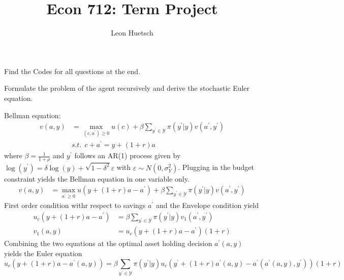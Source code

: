 \documentclass[letterpaper,12pt]{article}
\title{\fontsize{16pt}{1em}\bfseries Econ 712: Term Project}
\author{Leon Huetsch}
\newenvironment{problem}[2][Problem]{\begin{trivlist}
\item[\hskip \labelsep {\bfseries #1}\hskip \labelsep {\bfseries #2.}]}{\end{trivlist}}
\newenvironment{solution}[2][Solution]{\begin{trivlist}
\item[\hskip \labelsep {\bfseries #1}\hskip \labelsep {\bfseries #2.}]}{\end{trivlist}}
\begin{document}
\maketitle
Find the Codes for all questions at the end.

\begin{problem}{1}
Formulate the problem of the agent recursively and derive the stochastic Euler equation.
\end{problem}
\begin{solution}{1}
\begin{framed} 
Bellman equation:
\begin{align*}
v(a,y) &= \max_{(c,a^{\prime})\ge 0} u(c) + \beta \sum_{y^{\prime} \in \mathcal{Y}} \pi \left(y^{\prime} | y \right) v(a^{\prime},y^{\prime}) \\
&\textit{s.t.} \ \ c + a^{\prime} = y + (1+r)a 
\end{align*}
where $\beta = \frac{1}{1+\rho}$ and $y^{\prime}$ follows an AR(1) process given by $\log(y^{\prime}) = \delta \log(y) + \sqrt{1-\delta^2} \varepsilon$ with $\varepsilon \sim N(0,\sigma_Y^2)$. \newline \newline
Plugging in the budget constraint yields the Bellman equation in one variable only.
\begin{align}
v(a,y) &= \max_{a^{\prime}\ge 0} u(y + (1+r)a - a^{\prime}) + \beta \sum_{y^{\prime} \in \mathcal{Y}} \pi \left(y^{\prime} | y \right) v(a^{\prime},y^{\prime})
\end{align}
First order condition withr respect to savings $a^{\prime}$ and the Envelope condition yield
\begin{align*}
u_c (y + (1+r)a - a^{\prime}) &= \beta \sum_{y^{\prime} \in \mathcal{Y}} \pi \left(y^{\prime} | y \right) v_1 (a^{\prime},y^{\prime}) \\
v_1 (a,y) &= u_c (y + (1+r)a - a^{\prime}) (1+r)
\end{align*}
Combining the two equations at the optimal asset holding decision $a^{\prime} (a,y)$ yields the Euler equation
\begin{equation}
u_c (y + (1+r)a - a^{\prime} (a,y)) = \beta \sum_{y^{\prime} \in \mathcal{Y}} \pi \left(y^{\prime} | y \right) u_c \left( y^{\prime} + (1+r) a^{\prime} (a,y) - a^{\prime} (a^{\prime} (a,y),y^{\prime}) \right) (1+r)
\end{equation}


\end{framed}
\end{solution}
\end{document}
